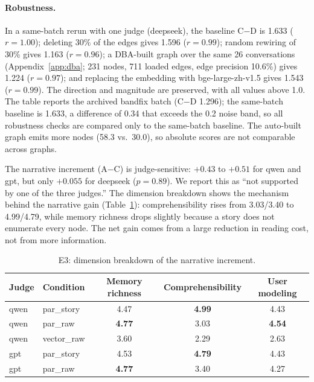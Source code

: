 \documentclass[11pt]{article}
\begin{document}
\paragraph{Robustness.} In a same-batch rerun with one judge (deepseek), the baseline C$-$D is
1.633 ($r=1.00$); deleting 30\% of the edges gives 1.596 ($r=0.99$); random rewiring of 30\%
gives 1.163 ($r=0.96$); a DBA-built graph over the same 26 conversations
(Appendix~\ref{app:dba}; 231 nodes, 711 loaded edges, edge precision 10.6\%) gives 1.224 ($r=0.97$); and replacing the
embedding with bge-large-zh-v1.5 gives 1.543 ($r=0.99$). The direction and magnitude are
preserved, with all values above 1.0. The table reports the archived bandfix batch (C$-$D 1.296);
the same-batch baseline is 1.633, a difference of 0.34 that exceeds the 0.2 noise band, so all
robustness checks are compared only to the same-batch baseline. The auto-built graph emits more
nodes (58.3 vs.\ 30.0), so absolute scores are not comparable across graphs.

The narrative increment (A$-$C) is judge-sensitive: $+0.43$ to $+0.51$ for qwen and gpt, but
only $+0.055$ for deepseek ($p=0.89$). We report this as ``not supported by one of the three
judges.'' The dimension breakdown shows the mechanism behind the narrative gain
(Table~\ref{tab:e3dims}): comprehensibility rises from 3.03/3.40 to 4.99/4.79, while memory
richness drops slightly because a story does not enumerate every node. The net gain comes from a
large reduction in reading cost, not from more information.

\begin{table}[t]
  \centering
  \small
  \begin{tabular}{@{}llccc@{}}
    \toprule
    Judge & Condition & Memory richness & Comprehensibility & User modeling \\
    \midrule
    qwen & par\_story & 4.47 & \textbf{4.99} & 4.43 \\
    qwen & par\_raw & \textbf{4.77} & 3.03 & \textbf{4.54} \\
    qwen & vector\_raw & 3.60 & 2.29 & 2.63 \\
    gpt & par\_story & 4.53 & \textbf{4.79} & 4.43 \\
    gpt & par\_raw & \textbf{4.77} & 3.40 & 4.27 \\
    \bottomrule
  \end{tabular}
  \caption{E3: dimension breakdown of the narrative increment.}\label{tab:e3dims}
\end{table}
\end{document}

